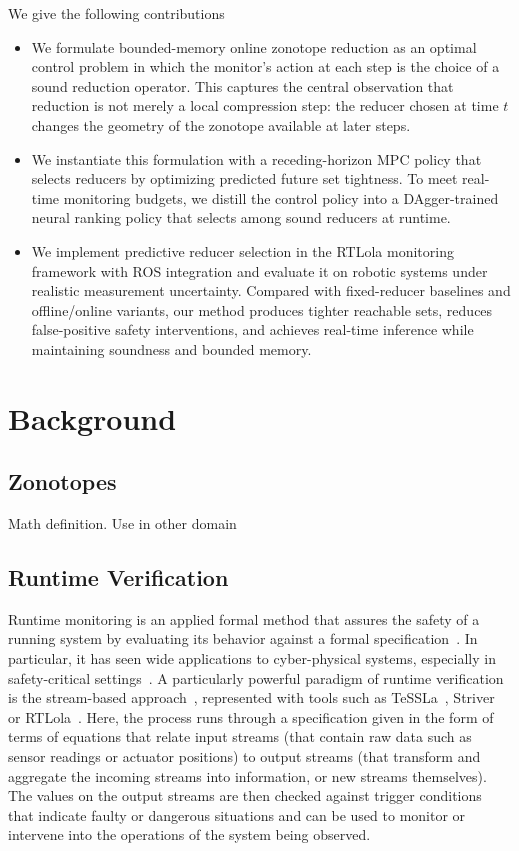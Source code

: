 \documentclass[letterpaper, 10 pt, conference]{ieeeconf}  %
\begin{document}
We give the following contributions 
\begin{itemize} 
\item We formulate bounded-memory online zonotope reduction as an optimal control problem in which the monitor's action at each step is the choice of a sound reduction operator. This captures the central observation that reduction is not merely a local compression step: the reducer chosen at time $t$ changes the geometry of the zonotope available at later steps.
\item We instantiate this formulation with a receding-horizon MPC policy that selects reducers by optimizing predicted future set tightness. To meet real-time monitoring budgets, we distill the control policy into a DAgger-trained neural ranking policy that selects among sound reducers at runtime.
\item We implement predictive reducer selection in the RTLola monitoring framework with ROS integration and evaluate it on robotic systems under realistic measurement uncertainty. Compared with fixed-reducer baselines and offline/online variants, our method produces tighter reachable sets, reduces false-positive safety interventions, and achieves real-time inference while maintaining soundness and bounded memory. 
\end{itemize}

\section{Background}
\subsection{Zonotopes}
Math definition. Use in other domain
\subsection{Runtime Verification}
Runtime monitoring is an applied formal method that assures the safety of a running system by evaluating its behavior against a formal specification~\cite{DBLP:journals/jlp/LeuckerS09}. In particular, it has seen wide applications to cyber-physical systems, especially in safety-critical settings~\cite{DBLP:series/lncs/BartocciDDFMNS18, DBLP:conf/cav/rtlolauav,DBLP:conf/cav/rtloltakeoff,DBLP:journals/fmsd/MoosbruggerRS17}. A particularly powerful paradigm of runtime verification is the stream-based approach~\cite{DBLP:conf/time/DAngeloSSRFSMM05}, represented with tools such as TeSSLa~\cite{DBLP:conf/sbmf/TeSSla}, Striver~\cite{DBLP:conf/rv/Striver} or RTLola~\cite{DBLP:conf/cav/FaymonvilleFSSS19}. Here, the process runs through a specification  given in the form of terms of equations that relate input streams (that contain raw data such as sensor readings or actuator positions) to output streams (that transform and aggregate the incoming streams into information, or new streams themselves). The values on the output streams are then checked against trigger conditions that indicate faulty or dangerous situations and can be used to monitor or intervene into the operations of the system being observed. 
\end{document}
